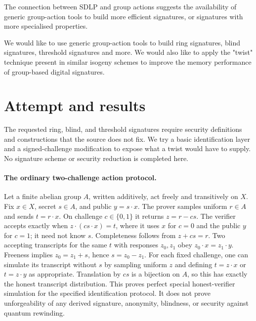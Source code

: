 \documentclass[11pt]{article}
\begin{document}
The connection between SDLP and group actions suggests the availability of generic group-action tools to build more efficient signatures, or signatures with more specialised properties.

We would like to use generic group-action tools to build ring signatures, blind signatures, threshold signatures and more. We would also like to apply the "twist" technique present in similar isogeny schemes to improve the memory performance of group-based digital signatures.

\section{Attempt and results}
The requested ring, blind, and threshold signatures require security definitions
and constructions that the source does not fix. We try a basic identification
layer and a signed-challenge modification to expose what a twist would have to
supply. No signature scheme or security reduction is completed here.

\paragraph{The ordinary two-challenge action protocol.}
Let a finite abelian group $A$, written additively, act freely and transitively
on $X$. Fix $x\in X$, secret $s\in A$, and public $y=s\cdot x$.
The prover samples uniform $r\in A$ and sends $t=r\cdot x$.
On challenge $c\in\{0,1\}$ it returns $z=r-cs$.
The verifier accepts exactly when $z\cdot(c s\cdot x)=t$, where it uses
$x$ for $c=0$ and the public $y$ for $c=1$; it need not know $s$.
Completeness follows from $z+cs=r$. Two accepting transcripts for the same
$t$ with responses $z_0,z_1$ obey $z_0\cdot x=z_1\cdot y$.
Freeness implies $z_0=z_1+s$, hence $s=z_0-z_1$.
For each fixed challenge, one can simulate its transcript without $s$ by
sampling uniform $z$ and defining $t=z\cdot x$ or $t=z\cdot y$ as
appropriate. Translation by $cs$ is a bijection on $A$, so this has exactly
the honest transcript distribution. This proves perfect special
honest-verifier simulation for the specified identification protocol. It does
not prove unforgeability of any derived signature, anonymity, blindness, or
security against quantum rewinding.
\end{document}
